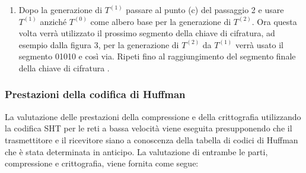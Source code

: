 \documentclass[a4paper]{report} %
\begin{document}
\begin{enumerate}
\item Dopo la generazione di $T^{(1)}$ passare al punto (c) del passaggio 2 e usare $T^{(1)}$ anziché $T^{(0)}$ come albero base per la generazione di $T^{(2)}$. Ora questa volta verrà utilizzato il prossimo segmento della chiave di cifratura, ad esempio dalla figura 3, per la generazione di $T^{(2)}$ da $T^{(1)}$ verrà usato il segmento 01010 e così via. Ripeti fino al raggiungimento del segmento finale della chiave di cifratura \cite{art:rif.45}.
\end{enumerate}

\subsubsection{Prestazioni della codifica di Huffman}
La valutazione delle prestazioni della compressione e della crittografia utilizzando la codifica SHT per le reti a bassa velocità viene eseguita presupponendo che il trasmettitore e il ricevitore siano a conoscenza della tabella di codici di Huffman che è stata determinata in anticipo. La valutazione di entrambe le parti, compressione e crittografia, viene fornita come segue:
\end{document}

